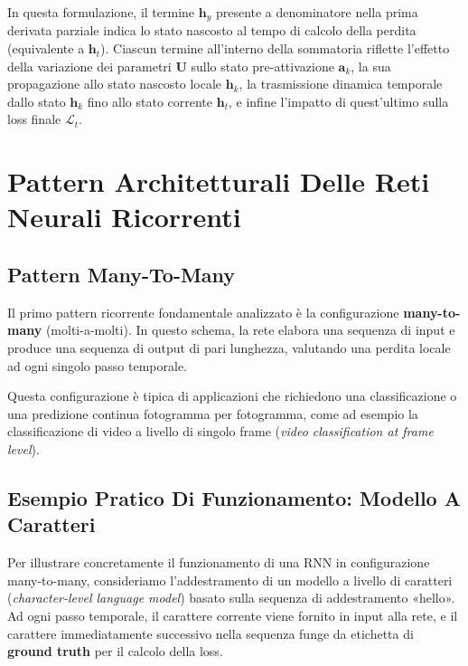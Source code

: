 ﻿\documentclass[11pt, a4paper]{article}
\begin{document}
In questa formulazione, il termine $\bm{h}_y$ presente a denominatore nella prima derivata parziale indica lo stato nascosto al tempo di calcolo della perdita (equivalente a $\bm{h}_t$). Ciascun termine all'interno della sommatoria riflette l'effetto della variazione dei parametri $\bm{U}$ sullo stato pre-attivazione $\bm{a}_k$, la sua propagazione allo stato nascosto locale $\bm{h}_k$, la trasmissione dinamica temporale dallo stato $\bm{h}_k$ fino allo stato corrente $\bm{h}_t$, e infine l'impatto di quest'ultimo sulla loss finale $\mathcal{L}_t$.

\newpage

\section{Pattern Architetturali Delle Reti Neurali Ricorrenti}

\subsection{Pattern Many-To-Many}

Il primo pattern ricorrente fondamentale analizzato è la configurazione \textbf{many-to-many} (molti-a-molti). In questo schema, la rete elabora una sequenza di input e produce una sequenza di output di pari lunghezza, valutando una perdita locale ad ogni singolo passo temporale.


Questa configurazione è tipica di applicazioni che richiedono una classificazione o una predizione continua fotogramma per fotogramma, come ad esempio la classificazione di video a livello di singolo frame (\emph{video classification at frame level}).

\subsection{Esempio Pratico Di Funzionamento: Modello A Caratteri}

Per illustrare concretamente il funzionamento di una RNN in configurazione many-to-many, consideriamo l'addestramento di un modello a livello di caratteri (\emph{character-level language model}) basato sulla sequenza di addestramento «hello». Ad ogni passo temporale, il carattere corrente viene fornito in input alla rete, e il carattere immediatamente successivo nella sequenza funge da etichetta di \textbf{ground truth} per il calcolo della loss.
\end{document}
